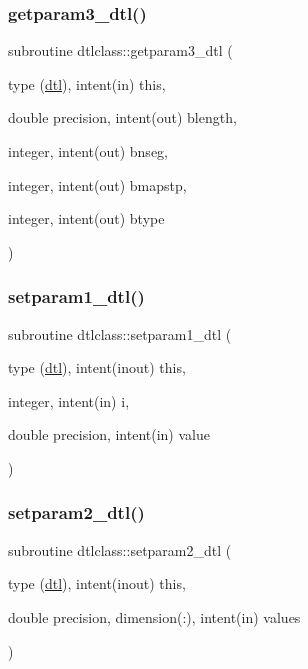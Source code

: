 \mbox{\label{namespacedtlclass_adb7337b9d81c5d4fef24ba72ad107cbe}} 
\subsubsection{\texorpdfstring{getparam3\_dtl()}{getparam3\_dtl()}}
{\footnotesize\ttfamily subroutine dtlclass\+::getparam3\+\_\+dtl (\begin{DoxyParamCaption}\item[{type (\mbox{\hyperlink{namespacedtlclass_structdtlclass_1_1dtl}{dtl}}), intent(in)}]{this,  }\item[{double precision, intent(out)}]{blength,  }\item[{integer, intent(out)}]{bnseg,  }\item[{integer, intent(out)}]{bmapstp,  }\item[{integer, intent(out)}]{btype }\end{DoxyParamCaption})}

\mbox{\label{namespacedtlclass_aa8af784d85ac535b6238e9dd4d844be9}} 
\subsubsection{\texorpdfstring{setparam1\_dtl()}{setparam1\_dtl()}}
{\footnotesize\ttfamily subroutine dtlclass\+::setparam1\+\_\+dtl (\begin{DoxyParamCaption}\item[{type (\mbox{\hyperlink{namespacedtlclass_structdtlclass_1_1dtl}{dtl}}), intent(inout)}]{this,  }\item[{integer, intent(in)}]{i,  }\item[{double precision, intent(in)}]{value }\end{DoxyParamCaption})}

\mbox{\label{namespacedtlclass_a267abecac3bfad96fd1ce717ba50c8b4}} 
\subsubsection{\texorpdfstring{setparam2\_dtl()}{setparam2\_dtl()}}
{\footnotesize\ttfamily subroutine dtlclass\+::setparam2\+\_\+dtl (\begin{DoxyParamCaption}\item[{type (\mbox{\hyperlink{namespacedtlclass_structdtlclass_1_1dtl}{dtl}}), intent(inout)}]{this,  }\item[{double precision, dimension(\+:), intent(in)}]{values }\end{DoxyParamCaption})}

